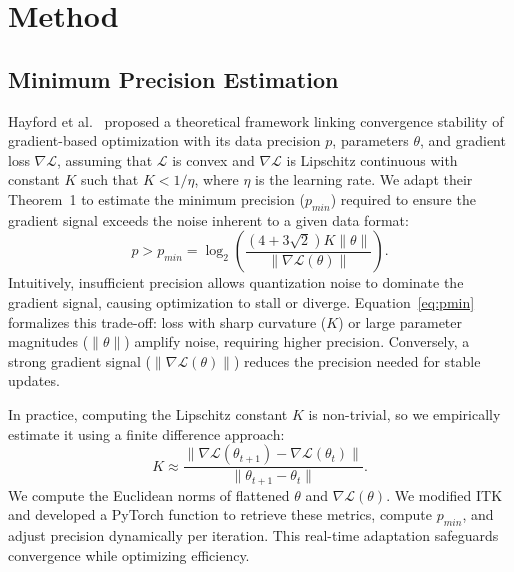 \documentclass[runningheads]{llncs}
\begin{document}
\section{Method}
\subsection{Minimum Precision Estimation}
Hayford et al.~\cite{Hayford2024-kb} proposed a theoretical framework linking
convergence stability of gradient-based optimization with its data precision $p$, parameters $\theta$,
and gradient loss $\nabla\mathcal{L}$, assuming that $\mathcal{L}$ is convex and $\nabla \mathcal{L}$ is Lipschitz continuous with constant $K$ such that $K < 1/\eta$, where $\eta$ is the learning rate. We adapt their Theorem~1 to estimate
the minimum precision ($p_{min}$) required to ensure the gradient signal exceeds
the noise inherent to a given data format:
\begin{equation}
	p > p_{min} = \log_2 \left( \frac{(4+3\sqrt{2}) K \|\theta\|}{\|\nabla\mathcal{L}(\theta)\|} \right) .
	\label{eq:pmin}
\end{equation}
Intuitively, insufficient precision allows quantization noise to dominate the
gradient signal, causing optimization to stall or diverge.
Equation~\ref{eq:pmin} formalizes this trade-off: loss with sharp curvature ($K$) or large parameter magnitudes ($\|\theta\|$) amplify noise, requiring
higher precision. Conversely, a strong gradient signal
($\|\nabla\mathcal{L}(\theta)\|$) reduces the precision needed for stable
updates.

In practice, computing the Lipschitz constant $K$ is non-trivial, so we empirically estimate it using a finite difference approach:
\begin{equation}
	K \approx \frac{\|\nabla\mathcal{L}(\theta_{t+1}) - \nabla\mathcal{L}(\theta_{t})\|}{\|\theta_{t+1} - \theta_{t}\|} .
\end{equation}
We compute the Euclidean norms of flattened $\theta$ and $\nabla\mathcal{L}(\theta)$. We modified ITK and developed a PyTorch function to retrieve these metrics, compute $p_{min}$, and adjust precision dynamically per iteration. This real-time adaptation safeguards convergence while optimizing efficiency.
\end{document}
